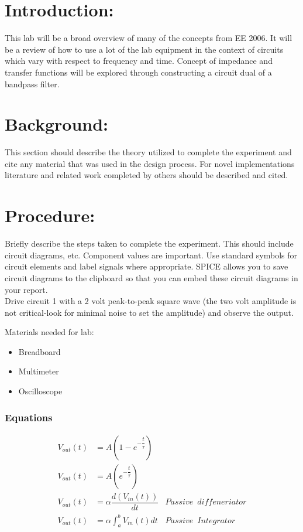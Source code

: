 \documentclass[10pt,a4paper,draft]{article}
\begin{document}
\part*{Introduction:}
This lab will be a broad overview of many of the concepts from EE 2006. It will be a review of how to use a lot of the lab equipment in the context of circuits which vary with respect to frequency and time. Concept of impedance and transfer functions will be explored through constructing a circuit dual of a bandpass filter.
\part*{Background:}
This section should describe the theory utilized to complete the experiment and cite any material that was used in the design process. For novel implementations literature and related work completed by others should be described and cited. 
\part*{Procedure:}
Briefly describe the steps taken to complete the experiment. This should include circuit diagrams, etc. Component values are important.   Use standard symbols for circuit elements and label signals where appropriate.  SPICE allows you to save circuit diagrams to the clipboard so that you can embed these circuit diagrams in your report.
\\

Drive circuit 1 with a 2 volt peak-to-peak square wave  (the two volt amplitude is not critical-look for minimal noise to set the amplitude) and observe the output.

\begin{flushleft}
Materials needed for lab:
\end{flushleft}
\begin{itemize}
\item Breadboard
\item Multimeter
\item Oscilloscope
\end{itemize}

 

\section{Equations}
 
\begin{align}
V_{out}(t) &=A(1-e^{-\dfrac{t}{\tau}}) \\
V_{out}(t) & =A(e^{-\dfrac{t}{\tau}}) \\
V_{out}(t) & = \alpha \dfrac{d(V_{in}(t))}{dt} & Passive\enspace diffeneriator \\
V_{out}(t) &= \alpha \int_{a}^{b} V_{in} (t)dt  & Passive\enspace Integrator
\end{align}
\end{document}

